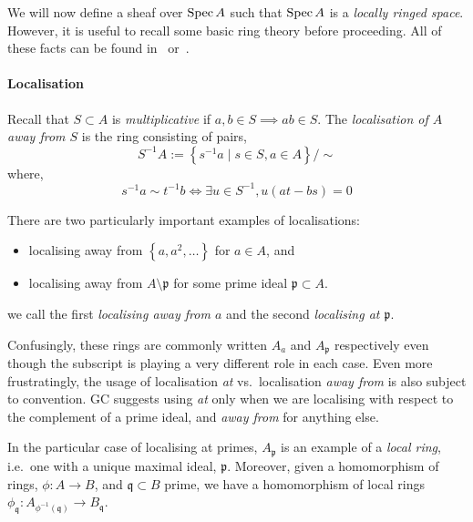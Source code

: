 \documentclass[000-main.tex]{subfiles}
\begin{document}
We will now define a sheaf over $\operatorname{Spec} A$ such that $\operatorname{Spec} A$ is a \emph{locally ringed space}.
However, it is useful to recall some basic ring theory before proceeding.
All of these facts can be found in~\cite[][81-86]{altmanTermCommutativeAlgebra2013} or~\cite[][36-49]{atiyahIntroductionCommutativeAlgebra2000}.

\paragraph{Localisation}

Recall that $S\subset A$ is \emph{multiplicative} if $a, b\in S \implies ab\in S$.
The \emph{localisation of $A$ away from $S$} is the ring consisting of pairs,
\begin{displaymath}
  S^{-1}A := \left\{ s^{-1}a \mid s\in S, a\in A \right\}/\sim
\end{displaymath}
where,
\begin{displaymath}
  s^{-1}a \sim t^{-1}b \iff
  \exists u\in S^{-1}, u(at - bs) = 0
\end{displaymath}

There are two particularly important examples of localisations:
\begin{itemize}
  \item localising away from $\left\{a, a^2, \ldots \right\}$ for $a\in A$, and
  \item localising away from $A\setminus\mathfrak{p}$ for some prime ideal $\mathfrak{p}\subset A$.
\end{itemize}
we call the first \emph{localising away from $a$} and the second \emph{localising at $\mathfrak{p}$}.

Confusingly, these rings are commonly written $A_a$ and $A_{\mathfrak{p}}$ respectively even though the subscript is playing a very different role in each case.
Even more frustratingly, the usage of localisation \emph{at} vs.\ localisation \emph{away from} is also subject to convention.
GC suggests using \emph{at} only when we are localising with respect to the complement of a prime ideal, and \emph{away from} for anything else.

In the particular case of localising at primes, $A_\mathfrak{p}$ is an example of a \emph{local ring}, i.e.\ one with a unique maximal ideal, $\mathfrak{p}$.
Moreover, given a homomorphism of rings, $\phi : A \to B$, and $\mathfrak{q}\subset B$ prime, we have a homomorphism of local rings $\phi_{\mathfrak{q}} : A_{\phi^{-1}(\mathfrak{q})} \to B_{\mathfrak{q}}$.
\end{document}
